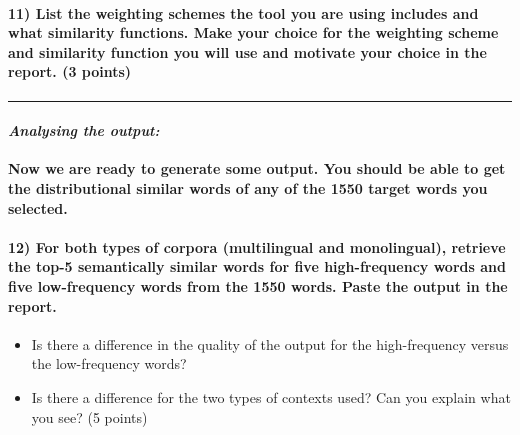 \documentclass[11pt]{article}
\providecommand{\tightlist}{%
      \setlength{\itemsep}{0pt}\setlength{\parskip}{0pt}}
\begin{document}
    \hypertarget{list-the-weighting-schemes-the-tool-you-are-using-includes-and-what-similarity-functions.-make-your-choice-for-the-weighting-scheme-and-similarity-function-you-will-use-and-motivate-your-choice-in-the-report.-3-points}{%
\paragraph{11) List the weighting schemes the tool you are using
includes and what similarity functions. Make your choice for the
weighting scheme and similarity function you will use and motivate your
choice in the report. (3
points)}\label{list-the-weighting-schemes-the-tool-you-are-using-includes-and-what-similarity-functions.-make-your-choice-for-the-weighting-scheme-and-similarity-function-you-will-use-and-motivate-your-choice-in-the-report.-3-points}}

    \begin{center}\rule{0.5\linewidth}{\linethickness}\end{center}

\hypertarget{analysing-the-output}{%
\paragraph{\texorpdfstring{\emph{Analysing the
output:}}{Analysing the output:}}\label{analysing-the-output}}

    \textbf{Now we are ready to generate some output. You should be able to
get the distributional similar words of any of the 1550 target words you
selected.}

    \hypertarget{for-both-types-of-corpora-multilingual-and-monolingual-retrieve-the-top-5-semantically-similar-words-for-five-high-frequency-words-and-five-low-frequency-words-from-the-1550-words.-paste-the-output-in-the-report.}{%
\paragraph{12) For both types of corpora (multilingual and monolingual),
retrieve the top-5 semantically similar words for five high-frequency
words and five low-frequency words from the 1550 words. Paste the output
in the
report.}\label{for-both-types-of-corpora-multilingual-and-monolingual-retrieve-the-top-5-semantically-similar-words-for-five-high-frequency-words-and-five-low-frequency-words-from-the-1550-words.-paste-the-output-in-the-report.}}

\begin{itemize}
\tightlist
\item
  Is there a difference in the quality of the output for the
  high-frequency versus the low-frequency words?
\item
  Is there a difference for the two types of contexts used? Can you
  explain what you see? (5 points)
\end{itemize}
\end{document}
